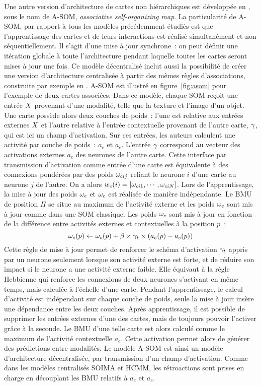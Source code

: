 \documentclass[../main]{subfiles}
\begin{document}
Une autre version d'architecture de cartes non hiérarchiques est développée en \cite{johnsson_associating_2008,johnsson_associative_2009}, sous le nom de A-SOM, \emph{associative self-organizing map}. 
La particularité de A-SOM, par rapport à tous les modèles précédemment étudiés est que l'apprentissage des cartes et de leurs interactions est réalisé simultanément et non séquentiellement. Il s'agit d'une mise à jour synchrone~: on peut définir une itération globale à toute l'architecture pendant laquelle toutes les cartes seront mises à jour une fois.
Ce modèle décentralisé inclut aussi la possibilité de créer une version d'architecture centralisée à partir des mêmes règles d'associations, construite par exemple en \cite{buonamente_hierarchies_2016}. A-SOM est illustré en figure~\ref{fig:asom} pour l'exemple de deux cartes associées. 
Dans ce modèle, chaque SOM reçoit une entrée $X$ provenant d'une modalité, telle que la texture et l'image d'un objet. Une carte possède alors deux couches de poids~: l'une est relative aux entrées externes $X$ et l'autre relative à l'entrée contextuelle provenant de l'autre carte, $\gamma$, qui est ici un champ d'activation.
Sur ces entrées, les auteurs calculent une activité par couche de poids~: $a_e$ et $a_c$.
L'entrée $\gamma$ correspond au vecteur des activations externes $a_e$ des neurones de l'autre carte.
Cette interface par transmission d'activation comme entrée d'une carte est équivalente à des connexions pondérées par des poids $\omega_{cij}$ reliant le neurone $i$ d'une carte au neurone $j$ de l'autre. 
On a alors $w_c(i) = [\omega_{ci1}, \cdots, \omega_{ciN}]$.
Lors de l'apprentissage, la mise à jour des poids $\omega_e$ et $\omega_c$ est réalisée de manière indépendante. 
Le BMU de position $\Pi$ se situe au maximum de l'activité externe et les poids $\omega_e$ sont mis à jour comme dans une SOM classique.
Les poids $\omega_c$ sont mis à jour en fonction de la différence entre activités externes et contextuelles à la position $p$~:
$$ \omega_c(p) \leftarrow \omega_c(p) + \beta \times \gamma_t \times (a_e(p) - a_c(p))$$
Cette règle de mise à jour permet de renforcer le schéma d'activation $\gamma_t$ appris par un neurone seulement lorsque son activité externe est forte, et de réduire son impact si le neurone a une activité externe faible. Elle équivaut à la règle Hebbienne qui renforce les connexions de deux neurones s'activant en même temps, mais calculée à l'échelle d'une carte.
Pendant l'apprentissage, le calcul d'activité est indépendant sur chaque couche de poids, seule la mise à jour insère une dépendance entre les deux couches.
Après apprentissage, il est possible de supprimer les entrées externes d'une des cartes, mais de toujours pouvoir l'activer grâce à la seconde. Le BMU d'une telle carte est alors calculé comme le maximum de l'activité contextuelle $a_c$. Cette activation permet alors de générer des prédictions entre modalités.
Le modèle A-SOM est ainsi un modèle d'architecture décentralisée, par transmission d'un champ d'activation. Comme dans les modèles centralisés SOIMA et HCMM, les rétroactions sont prises en charge en découplant les BMU relatifs à $a_e$ et $a_c$.
\end{document}
